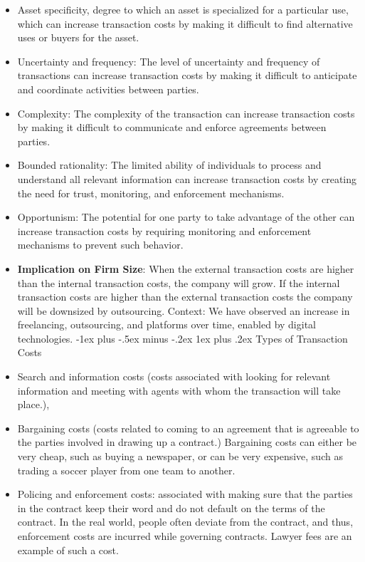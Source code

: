 \documentclass[12pt, landscape]{article}
\makeatletter
\renewcommand{\subsubsection}{\@startsection{subsubsection}{3}{0mm}%
                                {-1ex plus -.5ex minus -.2ex}%
                                {1ex plus .2ex}%
                                {\normalfont\small\bfseries}}
\makeatother
\begin{document}
\begin{multicols*}{3}
\begin{itemize}
\subsubsection{Determinants of TC}
\item Asset specificity, degree to which an asset is specialized for a particular use, which can increase transaction costs by making it difficult to find alternative uses or buyers for the asset.
\item Uncertainty and frequency: The level of uncertainty and frequency of transactions can increase transaction costs by making it difficult to anticipate and coordinate activities between parties.
\item Complexity: The complexity of the transaction can increase transaction costs by making it difficult to communicate and enforce agreements between parties.
\item Bounded rationality: The limited ability of individuals to process and understand all relevant information can increase transaction costs by creating the need for trust, monitoring, and enforcement mechanisms.
\item Opportunism: The potential for one party to take advantage of the other can increase transaction costs by requiring monitoring and enforcement mechanisms to prevent such behavior.
\item \textbf{Implication on Firm Size}: When the external transaction costs are higher than the internal transaction costs, the company will grow. If the internal transaction costs are higher than the external transaction costs the company will be downsized by outsourcing. Context: We have observed an increase in freelancing, outsourcing, and platforms over time, enabled by digital technologies.
\subsubsection{Types of Transaction Costs}
\item Search and information costs (costs associated with looking for relevant information and meeting with agents with whom the transaction will take place.), 
\item Bargaining costs (costs related to coming to an agreement that is agreeable to the parties involved in drawing up a contract.) Bargaining costs can either be very cheap, such as buying a newspaper, or can be very expensive, such as trading a soccer player from one team to another.
\item Policing and enforcement costs: associated with making sure that the parties in the contract keep their word and do not default on the terms of the contract. In the real world, people often deviate from the contract, and thus, enforcement costs are incurred while governing contracts. Lawyer fees are an example of such a cost.
\end{itemize}

\end{multicols*}
\end{document}
